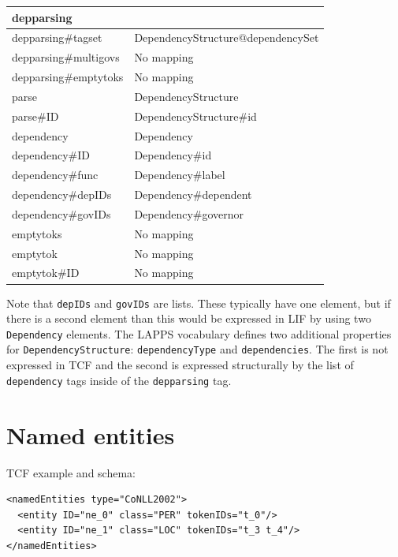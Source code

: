 \documentclass[11pt]{article}
\newcommand{\tag}[1]{{\tt #1}}
\newenvironment{example}
    {\begin{tcolorbox}\small}
    {\end{tcolorbox}}
\newenvironment{mappings}
	{\medskip\begin{tabular}{|l|l|}\hline}
	{\hline\end{tabular}\medskip}
\begin{document}
\begin{mappings}
depparsing				& \\ \hline
depparsing\#tagset		& DependencyStructure@dependencySet	\\ \hline
depparsing\#multigovs	& No mapping						\\ \hline
depparsing\#emptytoks	& No mapping						\\ \hline
parse					& DependencyStructure 				\\ \hline
parse\#ID				& DependencyStructure\#id			\\ \hline
dependency 				& Dependency 						\\ \hline
dependency\#ID 			& Dependency\#id 					\\ \hline
dependency\#func 		& Dependency\#label				 	\\ \hline
dependency\#depIDs 		& Dependency\#dependent			 	\\ \hline
dependency\#govIDs 		& Dependency\#governor				\\ \hline
emptytoks 				& No mapping 						\\ \hline
emptytok 				& No mapping 						\\ \hline
emptytok\#ID		 	& No mapping 						\\ \hline
\end{mappings}

Note that \tag{depIDs} and \tag{govIDs} are lists. These typically have one element, but if there is a second element than this would be expressed in LIF by using two \tag{Dependency} elements. The LAPPS vocabulary defines two additional properties for \tag{DependencyStructure}: \tag{dependencyType}
and \tag{dependencies}. The first is not expressed in TCF and the second is expressed structurally by the list of \tag{dependency} tags inside of the \tag{depparsing} tag.



\section{Named entities}

TCF example and schema:

\begin{example}
\begin{verbatim}
<namedEntities type="CoNLL2002">
  <entity ID="ne_0" class="PER" tokenIDs="t_0"/>
  <entity ID="ne_1" class="LOC" tokenIDs="t_3 t_4"/>
</namedEntities>
\end{verbatim}
\end{example}
\end{document}
